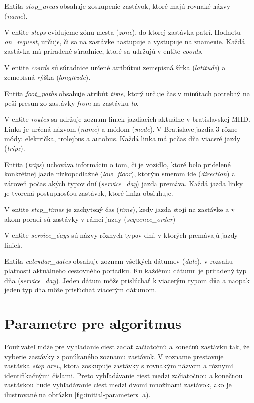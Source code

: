 Entita \textit{stop\_areas} obsahuje zoskupenie zastávok, ktoré majú rovnaké názvy (\textit{name}). 


V entite \textit{stops} evidujeme zónu mesta (\textit{zone}), do ktorej zastávka patrí. Hodnotu \textit{on\_request}, určuje, či sa na  zastávke nastupuje a vystupuje na znamenie. Každá zastávka má priradené súradnice, ktoré sa udržujú v entite \textit{coords}.

V entite \textit{coords} sú súradnice určené atribútmi zemepisná šírka (\textit{latitude}) a zemepisná výška (\textit{longitude}). 

Entita \textit{foot\_paths} obsahuje atribút \textit{time}, ktorý určuje čas v minútach potrebný na peší presun zo zastávky \textit{from} na zastávku \textit{to}.

V entite \textit{routes} sa udržuje zoznam liniek jazdiacich aktuálne v bratislavskej MHD. Linka je určená názvom (\textit{name}) a módom (\textit{mode}). V Bratislave jazdia 3 rôzne módy: električka, trolejbus a autobus. Každá linka má počas dňa viaceré jazdy (\textit{trips}).

Entita (\textit{trips}) uchováva informáciu o tom, či je vozidlo, ktoré bolo pridelené konkrétnej jazde nízkopodlažné (\textit{low\_floor}), ktorým smerom ide (\textit{direction}) a zároveň počas akých typov dní (\textit{service\_day}) jazda premáva. Každá jazda linky je tvorená postupnosťou zastávok, ktoré linka obsluhuje.

V entite \textit{stop\_times} je zachytený čas (\textit{time}), kedy jazda stojí na zastávke a v akom poradí sú zastávky v rámci jazdy (\textit{sequence\_order}).

V entite \textit{service\_days} sú názvy rôznych typov dní, v ktorých premávajú jazdy liniek. 

Entita \textit{calendar\_dates} obsahuje zoznam všetkých dátumov (\textit{date}), v rozsahu platnosti aktuálneho cestovného poriadku. Ku každému dátumu je priradený typ dňa (\textit{service\_day}). Jeden dátum môže prislúchať k viacerým typom dňa a naopak jeden typ dňa môže prislúchať viacerým dátumom.


\section{Parametre pre algoritmus}
Používateľ môže pre vyhľadanie ciest zadať začiatočnú a konečnú zastávku tak, že vyberie zastávky z ponúkaného zoznamu zastávok. V zozname prestavuje zastávka \textit{stop areu}, ktorá zoskupuje zastávky s rovnakým názvom a rôznymi identifikačnými číslami. Preto vyhľadávanie ciest medzi začiatočnou a konečnou zastávkou bude vyhľadávanie ciest medzi  dvomi množinami zastávok, ako je ilustrované na obrázku \ref{fig:initial-parameters} a).

